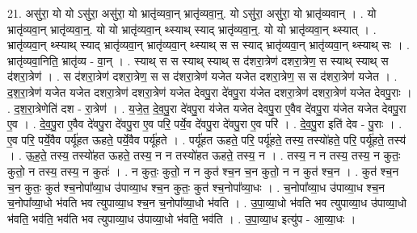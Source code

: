 \documentclass[17pt]{extarticle}
\begin{document}
21. असु॑रा॒ यो यो ऽसु॑रा॒ असु॑रा॒ यो भ्रातृ॑व्यवा॒न् भ्रातृ॑व्यवा॒न्॒. यो ऽसु॑रा॒ असु॑रा॒ यो भ्रातृ॑व्यवान् । . यो भ्रातृ॑व्यवा॒न् भ्रातृ॑व्यवा॒न्॒. यो यो भ्रातृ॑व्यवा॒न् थ्स्याथ् स्याद् भ्रातृ॑व्यवा॒न्॒. यो यो भ्रातृ॑व्यवा॒न् थ्स्यात् । . भ्रातृ॑व्यवा॒न् थ्स्याथ् स्याद् भ्रातृ॑व्यवा॒न् भ्रातृ॑व्यवा॒न् थ्स्याथ् स स स्याद् भ्रातृ॑व्यवा॒न् भ्रातृ॑व्यवा॒न् थ्स्याथ् सः । . भ्रातृ॑व्यवा॒निति॒ भ्रातृ॑व्य - वा॒न् । . स्याथ् स स स्याथ् स्याथ् स द॑शरा॒त्रेण॑ दशरा॒त्रेण॒ स स्याथ् स्याथ् स द॑शरा॒त्रेण॑ । . स द॑शरा॒त्रेण॑ दशरा॒त्रेण॒ स स द॑शरा॒त्रेण॑ यजेत यजेत दशरा॒त्रेण॒ स स द॑शरा॒त्रेण॑ यजेत । . द॒श॒रा॒त्रेण॑ यजेत यजेत दशरा॒त्रेण॑ दशरा॒त्रेण॑ यजेत देवपु॒रा दे॑वपु॒रा य॑जेत दशरा॒त्रेण॑ दशरा॒त्रेण॑ यजेत देवपु॒राः । . द॒श॒रा॒त्रेणेति॑ दश - रा॒त्रेण॑ । . य॒जे॒त॒ दे॒व॒पु॒रा दे॑वपु॒रा य॑जेत यजेत देवपु॒रा ए॒वैव दे॑वपु॒रा य॑जेत यजेत देवपु॒रा ए॒व । . दे॒व॒पु॒रा ए॒वैव दे॑वपु॒रा दे॑वपु॒रा ए॒व परि॒ पर्ये॒व दे॑वपु॒रा दे॑वपु॒रा ए॒व परि॑ । . दे॒व॒पु॒रा इति॑ देव - पु॒राः । . ए॒व परि॒ पर्ये॒वैव पर्यू॑हत ऊहते॒ पर्ये॒वैव पर्यू॑हते । . पर्यू॑हत ऊहते॒ परि॒ पर्यू॑हते॒ तस्य॒ तस्यो॑हते॒ परि॒ पर्यू॑हते॒ तस्य॑ । . ऊ॒ह॒ते॒ तस्य॒ तस्यो॑हत ऊहते॒ तस्य॒ न न तस्यो॑हत ऊहते॒ तस्य॒ न । . तस्य॒ न न तस्य॒ तस्य॒ न कुतः॒ कुतो॒ न तस्य॒ तस्य॒ न कुतः॑ । . न कुतः॒ कुतो॒ न न कुत॑ श्च॒न च॒न कुतो॒ न न कुत॑ श्च॒न । . कुत॑ श्च॒न च॒न कुतः॒ कुत॑ श्च॒नोपा᳚व्या॒ध उ॑पाव्या॒ध श्च॒न कुतः॒ कुत॑ श्च॒नोपा᳚व्या॒धः । . च॒नोपा᳚व्या॒ध उ॑पाव्या॒ध श्च॒न च॒नोपा᳚व्या॒धो भ॑वति भव त्युपाव्या॒ध श्च॒न च॒नोपा᳚व्या॒धो भ॑वति । . उ॒पा॒व्या॒धो भ॑वति भव त्युपाव्या॒ध उ॑पाव्या॒धो भ॑वति॒ भव॑ति॒ भव॑ति भव त्युपाव्या॒ध उ॑पाव्या॒धो भ॑वति॒ भव॑ति । . उ॒पा॒व्या॒ध इत्यु॑प - आ॒व्या॒धः । \newline
\end{document}

